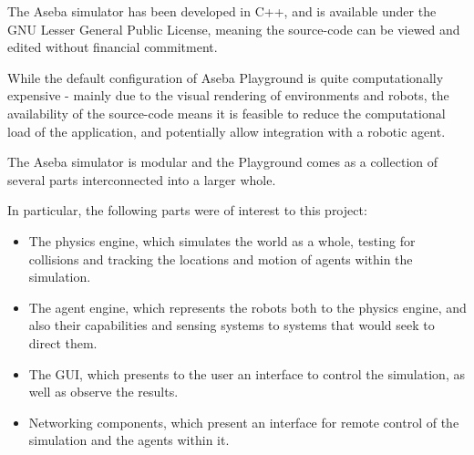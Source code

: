 The Aseba simulator has been developed in C++, and is available under the GNU
Lesser General Public License, meaning the source-code can be viewed and
edited without financial commitment.

While the default configuration of Aseba Playground is quite computationally
expensive - mainly due to the visual rendering of environments and robots, the
availability of the source-code means it is feasible to reduce the
computational load of the application, and potentially allow integration with a
robotic agent.

The Aseba simulator is modular and the Playground comes as a collection of
several parts interconnected into a larger whole.

In particular, the following parts were of interest to this project:
\begin{itemize}
    \item The physics engine, which simulates the world as a whole, testing for
        collisions and tracking the locations and motion of agents within the
        simulation.
    \item The agent engine, which represents the robots both to the physics
        engine, and also their capabilities and sensing systems to systems that
        would seek to direct them.
    \item The GUI, which presents to the user an interface to control the
        simulation, as well as observe the results.
    \item Networking components, which present an interface for remote
        control of the simulation and the agents within it.
\end{itemize}
